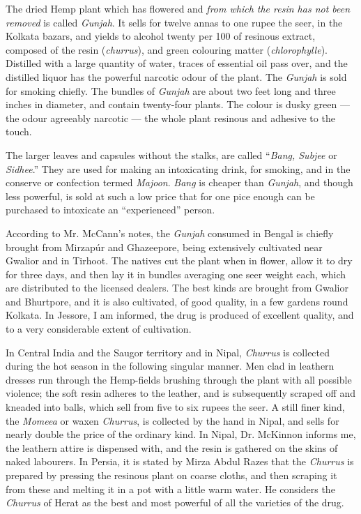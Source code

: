\documentclass[a4paper, 11pt, oneside, polutonikogreek, english]{article}
\begin{document}
The dried Hemp plant which has flowered and \emph{from which the resin has not been removed} is called \emph{Gunjah}. It sells for twelve annas to one rupee the seer, in the Kolkata bazars, and yields to alcohol twenty per 100 of resinous extract, composed of the resin (\emph{churrus}), and green colouring matter (\emph{chlorophylle}). Distilled with a large quantity of water, traces of essential oil pass over, and the distilled liquor has the powerful narcotic odour of the plant. The \emph{Gunjah} is sold for smoking chiefly. The bundles of \emph{Gunjah} are about two feet long and three inches in diameter, and contain twenty-four plants. The colour is dusky green --- the odour agreeably narcotic --- the whole plant resinous and adhesive to the touch.

The larger leaves and capsules without the stalks, are called ``\emph{Bang, Subjee} or \emph{Sidhee}.'' They are used for making an intoxicating drink, for smoking, and in the conserve or confection termed \emph{Majoon}. \emph{Bang} is cheaper than \emph{Gunjah}, and though less powerful, is sold at such a low price that for one pice enough can be purchased to intoxicate an ``experienced'' person.

According to Mr. McCann's notes, the \emph{Gunjah} consumed in Bengal is chiefly brought from Mirzapúr and Ghazeepore, being extensively cultivated near Gwalior and in Tirhoot. The natives cut the plant when in flower, allow it to dry for three days, and then lay it in bundles averaging one seer weight each, which are distributed to the licensed dealers. The best kinds are brought from Gwalior and Bhurtpore, and it is also cultivated, of good quality, in a few gardens round Kolkata. In Jessore, I am informed, the drug is produced of excellent quality, and to a very considerable extent of cultivation.

In Central India and the Saugor territory and in Nipal, \emph{Churrus} is collected during the hot season in the following singular manner. Men clad in leathern dresses run through the Hemp-fields brushing through the plant with all possible violence; the soft resin adheres to the leather, and is subsequently scraped off and kneaded into balls, which sell from five to six rupees the seer. A still finer kind, the \emph{Momeea} or waxen \emph{Churrus}, is collected by the hand in Nipal, and sells for nearly double the price of the ordinary kind. In Nipal, Dr. McKinnon informs me, the leathern attire is dispensed with, and the resin is gathered on the skins of naked labourers. In Persia, it is stated by Mirza Abdul Razes that the \emph{Churrus} is prepared by pressing the resinous plant on coarse cloths, and then scraping it from these and melting it in a pot with a little warm water. He considers the \emph{Churrus} of Herat as the best and most powerful of all the varieties of the drug.
\clearpage
\end{document}
